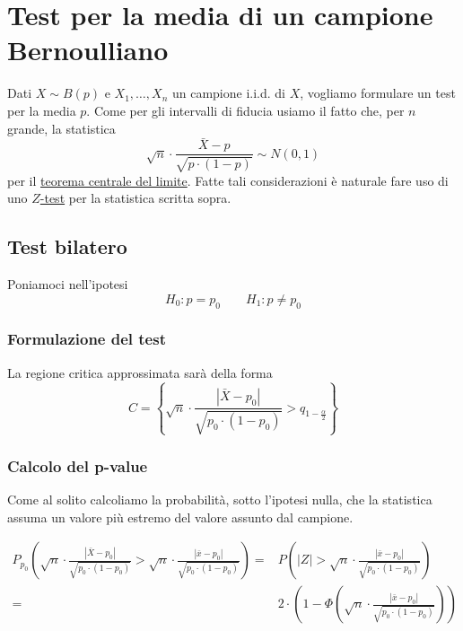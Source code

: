 \section{Test per la media di un campione Bernoulliano}
Dati $X \sim B(p)$ e $X_1, \dots, X_n$ un campione i.i.d. di $X$, vogliamo formulare un test per la
media $p$. Come per gli intervalli di fiducia usiamo il fatto che, per $n$ grande, la statistica
\[ \sqrt{n} \cdot \frac{\bar{X} - p}{\sqrt{p \cdot (1-p)}} \sim N(0,1) \]
per il \hyperref[th: tlc]{teorema centrale del limite}. Fatte tali considerazioni è naturale fare
uso di uno \hyperref[sec: z-test]{$Z$-test} per la statistica scritta sopra.

\subsection{Test bilatero}
Poniamoci nell'ipotesi
\[ H_0: p = p_0 \qquad H_1: p \neq p_0 \]

\subsubsection{Formulazione del test}
La regione critica approssimata sarà della forma
\[
	C = \left\{ \sqrt{n} \cdot \frac{|\bar{X} - p_0|}{\sqrt{p_0 \cdot (1-p_0)}} >
	q_{1 - \frac{\alpha}{2}}\right\}
\]

\subsubsection{Calcolo del p-value}
Come al solito calcoliamo la probabilità, sotto l'ipotesi nulla, che la statistica assuma un valore
più estremo del valore assunto dal campione.

\begin{align*}
	P_{p_0} \left( \sqrt{n} \cdot \frac{|\bar{X} - p_0|}{\sqrt{p_0 \cdot (1-p_0)}} >
	\sqrt{n} \cdot \frac{|\bar{x} - p_0|}{\sqrt{p_0 \cdot (1-p_0)}} \right) = &
	P \left( |Z| > \sqrt{n} \cdot \frac{|\bar{x} - p_0|}{\sqrt{p_0 \cdot (1-p_0)}} \right) \\
	=                                                                         &
	2 \cdot \left( 1 - \Phi \left( \sqrt{n} \cdot
		\frac{|\bar{x} - p_0|}{\sqrt{p_0 \cdot (1-p_0)}} \right) \right)
\end{align*}

